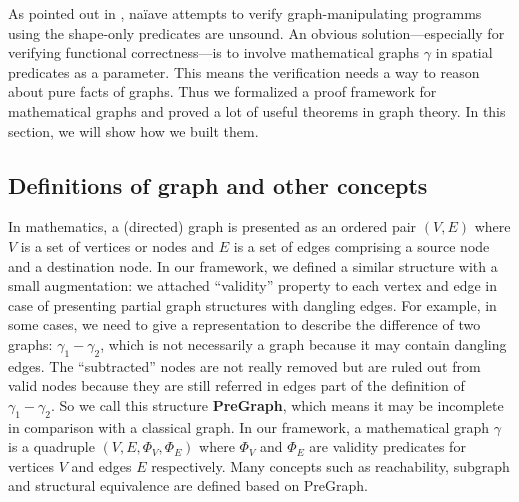 As pointed out in \cite{hobor:ramification}, na\"iave attempts to
verify graph-manipulating programms using the shape-only predicates
are unsound. An obvious solution---especially for verifying functional
correctness---is to involve mathematical graphs $\gamma$ in spatial
predicates as a parameter. This means the verification needs a way to
reason about pure facts of graphs. Thus we formalized a proof
framework for mathematical graphs and proved a lot of useful theorems
in graph theory. In this section, we will show how we built them.

\subsection{Definitions of graph and other concepts}

In mathematics, a (directed) graph is presented as an ordered pair
$(V, E)$ where $V$ is a set of vertices or nodes and $E$ is a set of
edges comprising a source node and a destination node. In our
framework, we defined a similar structure with a small augmentation:
we attached ``validity'' property to each vertex and edge in case of
presenting partial graph structures with dangling edges. For example,
in some cases, we need to give a representation to describe the
difference of two graphs: $\gamma_1-\gamma_2$, which is not
necessarily a graph because it may contain dangling edges. The
``subtracted'' nodes are not really removed but are ruled out from
valid nodes because they are still referred in edges part of the
definition of $\gamma_1-\gamma_2$. So we call this
structure \textbf{PreGraph}, which means it may be incomplete in
comparison with a classical graph. In our framework, a mathematical
graph $\gamma$ is a quadruple $(V, E, \Phi_V, \Phi_E)$ where $\Phi_V$ and
$\Phi_E$ are validity predicates for vertices $V$ and edges $E$
respectively. Many concepts such as reachability, subgraph and
structural equivalence are defined based on PreGraph.

